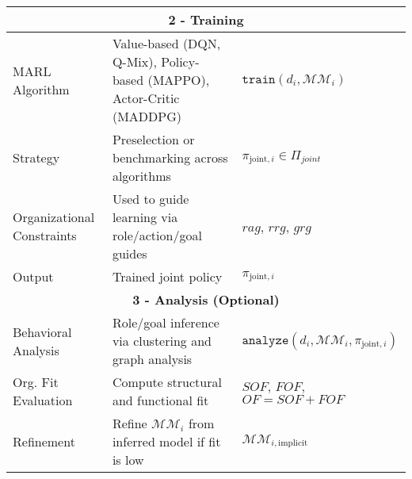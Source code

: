\begin{table}[h!]
\begin{footnotesize}
\begin{tabular}{|p{3cm}|p{6cm}|p{3cm}|}
            \multicolumn{3}{|c|}{\textbf{2 - Training}}                                                                                                                                                                                                                                    \\ \hline
            MARL Algorithm                & Value-based (DQN, Q-Mix), Policy-based (MAPPO), Actor-Critic (MADDPG)          & $\texttt{train}(d_i, \mathcal{MM}_i)$                                                                                                                         \\ \hline
            Strategy                      & Preselection or benchmarking across algorithms                                 & $\pi_{\text{joint}, i} \in \Pi_{joint}$                                                                                                                       \\ \hline
            Organizational Constraints    & Used to guide learning via role/action/goal guides                             & $rag$, $rrg$, $grg$                                                                                                                                           \\ \hline
            Output                        & Trained joint policy                                                           & $\pi_{\text{joint}, i}$                                                                                                                                       \\ \hline

            \multicolumn{3}{|c|}{\textbf{3 - Analysis (Optional)}}                                                                                                                                                                                                                         \\ \hline
            Behavioral Analysis           & Role/goal inference via clustering and graph analysis                          & $\texttt{analyze}(d_i, \mathcal{MM}_i, \pi_{\text{joint}, i})$                                                                                                \\ \hline
            Org. Fit Evaluation           & Compute structural and functional fit                                          & $SOF$, $FOF$, $OF = SOF + FOF$                                                                                                                                \\ \hline
            Refinement                    & Refine $\mathcal{MM}_i$ from inferred model if fit is low                      & $\mathcal{MM}_{i, \text{implicit}}$                                                                                                                           \\ \hline


\end{tabular}
\end{footnotesize}
\end{table}
